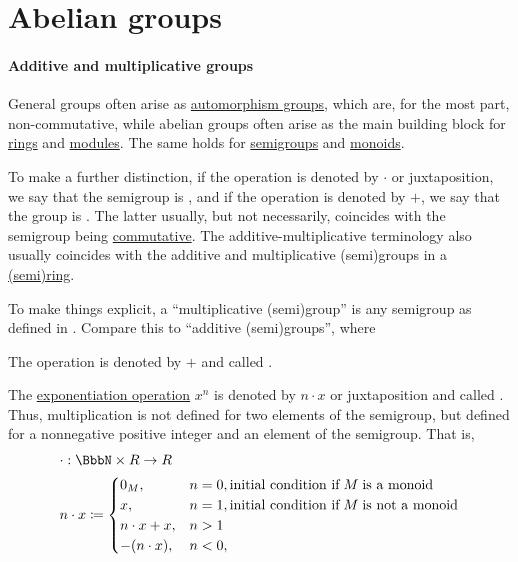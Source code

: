 \section{Abelian groups}\label{sec:abelian_groups}

\paragraph{Additive and multiplicative groups}

\begin{concept}\label{con:additive_semigroup}\mimprovised
  General groups often arise as \hyperref[def:automorphism_group]{automorphism groups}, which are, for the most part, non-commutative, while abelian groups often arise as the main building block for \hyperref[def:ring]{rings} and \hyperref[def:module]{modules}. The same holds for \hyperref[def:semigroup]{semigroups} and \hyperref[def:monoid]{monoids}.

  To make a further distinction, if the operation is denoted by \( \cdot \) or juxtaposition, we say that the semigroup is , and if the operation is denoted by \( + \), we say that the group is . The latter usually, but not necessarily, coincides with the semigroup being \hyperref[def:binary_operation/commutative]{commutative}. The additive-multiplicative terminology also usually coincides with the additive and multiplicative (semi)groups in a \hyperref[def:semiring]{(semi)ring}.

  To make things explicit, a \enquote{multiplicative (semi)group} is any semigroup as defined in . Compare this to \enquote{additive (semi)groups}, where
  \begin{thmenum}
     The operation is denoted by \( + \) and called .

     The \hyperref[def:semigroup/exponentiation]{exponentiation operation} \( x^n \) is denoted by \( n \cdot x \) or juxtaposition and called . Thus, multiplication is not defined for two elements of the semigroup, but defined for a nonnegative positive integer and an element of the semigroup. That is,
    \begin{equation}\label{eq:con:additive_semigroup/multiplication}
      \begin{aligned}
        &\cdot: \BbbN \times R \to R \\
        &n \cdot x \coloneqq \begin{cases}
          0_M,           &n = 0, \T{initial condition if} M \T{is a monoid} \\
          x,             &n = 1, \T{initial condition if} M \T{is not a monoid} \\
          n \cdot x + x, &n > 1 \\
          -(n \cdot x),  &n < 0, \\
        \end{cases}
      \end{aligned}
    \end{equation}


\end{thmenum}
\end{concept}

